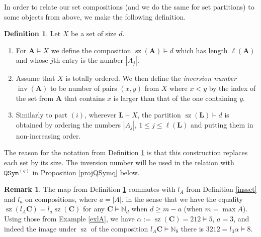 \documentclass{article}
\theoremstyle{definition}
\newtheorem{defn}[thm]{Definition}
\newtheorem{rmk}[thm]{Remark}
\begin{document}
In order to relate our set compositions (and we do the same for set partitions) to some objects from above, we make the following definition.
\begin{defn}
Let $X$ be a set of size $d$.
\begin{enumerate}[$(i)$]
\item For $\mathbf{A} \vDash X$ we define the composition $\operatorname{sz}(\mathbf{A}) \vDash d$ which has length $\ell(\mathbf{A})$ and whose $j$th entry is the number $|A_{j}|$.
\item Assume that $X$ is totally ordered. We then define the \emph{inversion number} $\operatorname{inv}(\mathbf{A})$ to be number of pairs $(x,y)$ from $X$ where $x<y$ by the index of the set from $\mathbf{A}$ that contains $x$ is larger than that of the one containing $y$.
\item Similarly to part $(i)$, wherever $\mathbf{L} \vdash X$, the partition $\operatorname{sz}(\mathbf{L}) \vdash d$ is obtained by ordering the numbers $|A_{j}|$, $1 \leq j\leq\ell(\mathbf{L})$ and putting them in non-increasing order.
\end{enumerate} \label{sizes}
\end{defn}
The reason for the notation from Definition \ref{sizes} is that this construction replaces each set by its size. The inversion number will be used in the relation with $\mathtt{QSym}^{(q)}$ in Proposition \ref{projQSymq} below.

\begin{rmk}
The map from Definition \ref{sizes} commutes with $l_{A}$ from Definition \ref{insset} and $l_{a}$ on compositions, where $a=|A|$, in the sense that we have the equality $\operatorname{sz}(l_{A}\mathbf{C})=l_{a}\operatorname{sz}(\mathbf{C})$ for any $\mathbf{C}\vDash\mathbb{N}_{d}$ when $d \geq m-a$ (when $m=\max A$). Using those from Example \ref{exlA}, we have $\alpha:=\operatorname{sz}(\mathbf{C})=212\vDash5$, $a=3$, and indeed the image under $\operatorname{sz}$ of the composition $l_{A}\mathbf{C}\vDash\mathbb{N}_{8}$ there is $3212=l_{3}\alpha\vDash8$. \label{szlrel}
\end{rmk}

\medskip
\end{document}
